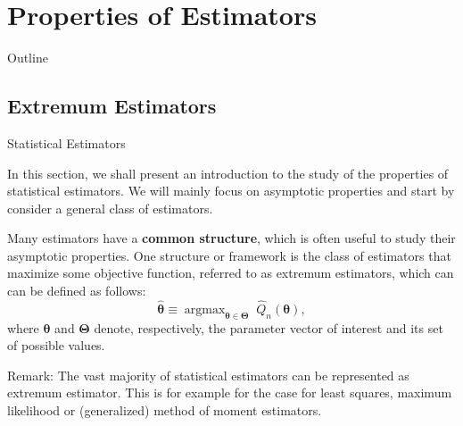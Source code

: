 \documentclass[envcountsect,usenames,dvipsnames]{beamer}
\DeclareMathOperator*{\argmax}{argmax}
\def\btheta{\bm \theta}
\def\bTheta{\bm \Theta}
\theoremstyle{mystyle}
\begin{document}

\section{Properties of Estimators}\newrefsection

\begin{frame}{Outline}
\small
\begin{multicols}{2}
  \tableofcontents[currentsection]
\end{multicols}
\end{frame}

\subsection{Extremum Estimators}

\begin{frame}{Statistical Estimators}
\footnotesize

In this section, we shall present an introduction to the study of the properties of statistical estimators. We will mainly focus on asymptotic properties and start by consider a general class of estimators.
\vspace{0.15cm}

	\begin{Definition}
	\label{def:extrem:est}
	Many estimators have a \textbf{{\color{beamer@UIUCblue}common structure}}, which is often useful to study their asymptotic properties. One structure or framework is the class of estimators that maximize some objective function, referred to as extremum estimators, which can can be defined as follows:
		\begin{equation}
			{\hat{\btheta} \equiv \argmax_{\btheta \in \bTheta} \; \hat{Q}_n (\btheta),}
			\label{eq:extrem:estim}
		\end{equation}
		where $\btheta$ and $\bTheta$ denote, respectively, the parameter vector of interest and its set of possible values.
	\end{Definition}
	
	\begin{exampleblock}{Remark:}
		The vast majority of statistical estimators can be represented as extremum estimator. This is for example for the case for least squares, maximum likelihood or (generalized) method of moment estimators.
	\end{exampleblock}
\end{frame} 
\end{document}
